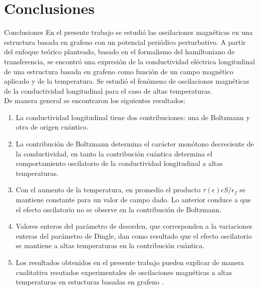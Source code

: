 
	\section{Conclusiones}
		\begin{frame}{Conclusiones}
			En el presente trabajo se estudió las oscilaciones magnéticas en una estructura basada en grafeno con un potencial periódico perturbativo. A partir del enfoque teórico planteado, basado en el formalismo del hamiltoniano de transferencia, se encontró una expresión de la conductividad eléctrica longitudinal de una estructura basada en grafeno como función de un campo magnético aplicado y de la temperatura. Se estudió el fenómeno de oscilaciones magnéticas de la conductividad longitudinal para el caso de altas temperaturas.\\
			De manera general se encontraron los siguientes resultados:

		\end{frame}

		\begin{frame}
		\footnotesize

		\begin{enumerate}
		 	\item 
			La conductividad longitudinal tiene dos contribuciones: una de Boltzmann y otra de origen cuántico. 
			
			\item 
			La contribución de Boltzmann determina el carácter monótono decreciente de la conductividad, en tanto la contribución cuántica determina el comportamiento oscilatorio de la conductividad longitudinal a altas temperaturas.
			
			\item 
			Con el aumento de la temperatura, en promedio el producto $\tau(\epsilon)\epsilon S/\epsilon_{f}$ se mantiene constante para un valor de campo dado. Lo anterior conduce a que el efecto oscilatorio no se observe en la contribución de Boltzmann.
			
			\item 
			Valores enteros del parámetro de desorden, que corresponden a la variaciones enteras del parámetro de Dingle, dan como resultado que el efecto oscilatorio se mantiene a altas temperaturas en la contribución cuántica.
			
			\item 
			Los resultados obtenidos en el presente trabajo pueden explicar de manera cualitativa resutados experimentales de oscilaciones magnéticas a altas temperaturas en estucturas basadas en grafeno \cite{Kumar2017}.
		\end{enumerate}
			
		\end{frame}